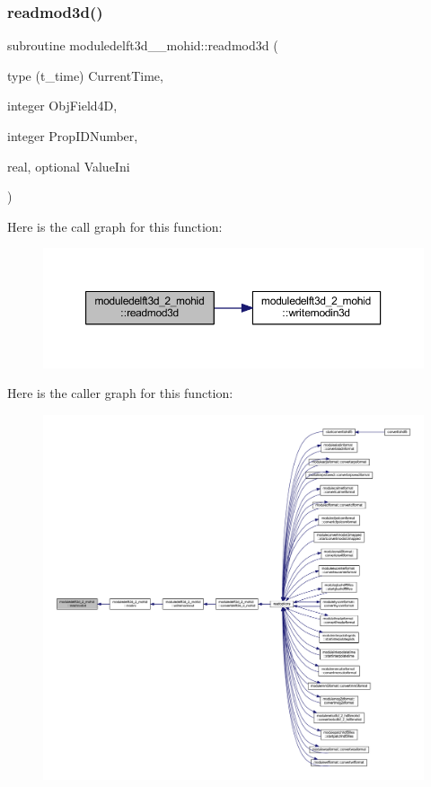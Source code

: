 \subsubsection{\texorpdfstring{readmod3d()}{readmod3d()}}
{\footnotesize\ttfamily subroutine moduledelft3d\+\_\+\_\+mohid\+::readmod3d (\begin{DoxyParamCaption}\item[{type (t\+\_\+time)}]{Current\+Time,  }\item[{integer}]{Obj\+Field4D,  }\item[{integer}]{Prop\+I\+D\+Number,  }\item[{real, optional}]{Value\+Ini }\end{DoxyParamCaption})\hspace{0.3cm}{\ttfamily [private]}}

Here is the call graph for this function\+:\nopagebreak
\begin{figure}[H]
\begin{center}
\leavevmode
\includegraphics[width=350pt]{namespacemoduledelft3d__2__mohid_aab6512966524b2869edb990481150929_cgraph}
\end{center}
\end{figure}
Here is the caller graph for this function\+:\nopagebreak
\begin{figure}[H]
\begin{center}
\leavevmode
\includegraphics[width=350pt]{namespacemoduledelft3d__2__mohid_aab6512966524b2869edb990481150929_icgraph}
\end{center}
\end{figure}
